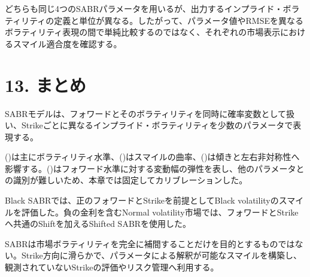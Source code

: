 \documentclass[
  letterpaper,
  DIV=11,
  numbers=noendperiod]{scrreprt}
\begin{document}
どちらも同じ4つのSABRパラメータを用いるが、出力するインプライド・ボラティリティの定義と単位が異なる。したがって、パラメータ値やRMSEを異なるボラティリティ表現の間で単純比較するのではなく、それぞれの市場表示におけるスマイル適合度を確認する。

\section{13. まとめ}\label{ux307eux3068ux3081-4}

SABRモデルは、フォワードとそのボラティリティを同時に確率変数として扱い、Strikeごとに異なるインプライド・ボラティリティを少数のパラメータで表現する。

(\alpha)は主にボラティリティ水準、(\nu)はスマイルの曲率、(\rho)は傾きと左右非対称性へ影響する。(\beta)はフォワード水準に対する変動幅の弾性を表し、他のパラメータとの識別が難しいため、本章では固定してカリブレーションした。

Black SABRでは、正のフォワードとStrikeを前提としてBlack
volatilityのスマイルを評価した。負の金利を含むNormal
volatility市場では、フォワードとStrikeへ共通のShiftを加えるShifted
SABRを使用した。

SABRは市場ボラティリティを完全に補間することだけを目的とするものではない。Strike方向に滑らかで、パラメータによる解釈が可能なスマイルを構築し、観測されていないStrikeの評価やリスク管理へ利用する。
\end{document}
